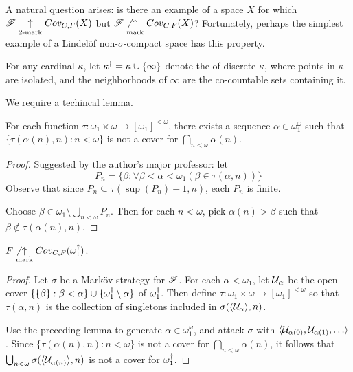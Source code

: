 A natural question arises: is there an example of a space $X$ for which
$\mathscr{F}\underset{2\text{-mark}}{\uparrow}Cov_{C,F}(X)$ but $\mathscr{F}\not\underset{\text{mark}}{\uparrow}Cov_{C,F}(X)$? Fortunately,
perhaps the simplest example of a Lindel\"of non-$\sigma$-compact
space has this property.

\begin{defn}
  For any cardinal $\kappa$, let $\kappa^\dagger=\kappa\cup\{\infty\}$ denote
  the  of discrete $\kappa$, where points in
  $\kappa$ are isolated, and the neighborhoods of $\infty$ are the co-countable
  sets containing it.
\end{defn}

We require a techincal lemma.

\begin{lem}
  For each function
  $\tau:\omega_1\times\omega \rightarrow [\omega_1]^{<\omega}$,
  there exists a sequence $\alpha\in\omega_1^\omega$
  such that $\{\tau(\alpha(n),n): n<\omega\}$ is not a cover for
  $\bigcap_{n<\omega}\alpha(n)$.
\end{lem}

\begin{proof}
  Suggested by the author's major professor: let
    \[
      P_n =
      \{
        \beta : \forall \beta <\alpha < \omega_1 ( \beta \in \tau(\alpha, n))
      \}
    \]
  Observe that since
  $P_n \subseteq \tau(\sup(P_n)+1, n)$, each $P_n$ is finite.

  Choose $\beta \in\omega_1\setminus \bigcup_{n<\omega} P_n$. Then for each
  $n<\omega$, pick $\alpha(n)>\beta$ such that
  $\beta \not\in \tau(\alpha(n),n)$.
\end{proof}

\begin{thm}
  $F\not\underset{\text{mark}}{\uparrow}Cov_{C,F}(\omega_1^\dagger)$.
\end{thm}

\begin{proof}
  Let $\sigma$ be a Mark\"ov strategy for $\mathscr{F}$. For each $\alpha<\omega_1$,
  let $\mathcal{U}_\alpha$ be the open cover
  $\{\{\beta\}:\beta<\alpha\}\cup\{\omega_1^\dagger\setminus\alpha\}$ of
  $\omega_1^\dagger$. Then define
  $\tau:\omega_1\times\omega \rightarrow [\omega_1]^{<\omega}$ so that
  $\tau(\alpha,n)$ is the collection of singletons included in
  $\sigma(\langle\mathcal{U}_\alpha\rangle,n)$.

  Use the preceding lemma to generate $\alpha\in\omega_1^\omega$, and attack
  $\sigma$ with $\<\mc U_{\alpha(0)}, \mc U_{\alpha(1)},\dots\>$.
  Since $\{\tau(\alpha(n),n): n<\omega\}$ is not a cover for
  $\bigcap_{n<\omega}\alpha(n)$, it follows that
  $\bigcup_{n<\omega}\sigma(\langle\mathcal{U}_{\alpha(n)}\rangle,n)$ is not a cover for
  $\omega_1^\dagger$.
\end{proof}

